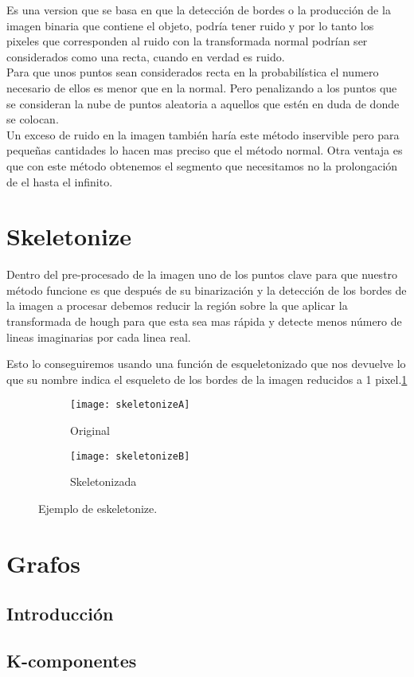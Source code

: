\cite{Kiryati20001157}Es una version que se basa en que la detección de bordes o la producción de la imagen binaria que contiene el objeto, podría tener ruido y por lo tanto los pixeles que corresponden al ruido con la transformada normal podrían ser considerados como una recta, cuando en verdad es ruido.\\
Para que unos puntos sean considerados recta en la probabilística el numero necesario de ellos es menor que en la normal. Pero penalizando a los puntos que se consideran la nube de puntos aleatoria a aquellos que estén en duda de donde se colocan.\\
Un exceso de ruido en la imagen también haría este método inservible pero para pequeñas cantidades lo hacen mas preciso que el método normal.
Otra ventaja es que con este método obtenemos el segmento que necesitamos no la prolongación de el hasta el infinito.

\section{Skeletonize }
\cite{scik:skeleton} Dentro del pre-procesado de la imagen uno de los puntos clave para que nuestro método funcione es que después de su binarización y la detección de los bordes de la imagen a procesar debemos reducir la región sobre la que aplicar la transformada de hough para que esta sea mas rápida y detecte menos número de lineas imaginarias por cada linea real.

Esto lo conseguiremos usando una función de esqueletonizado que nos devuelve lo que su nombre indica el esqueleto de los bordes de la imagen reducidos a 1 pixel.\ref{fig:3.6}


\begin{figure}
\begin{subfigure}[b]{.5\linewidth}
\centering\large \texttt{[image: skeletonizeA]}
\caption{Original}
\end{subfigure}%
\begin{subfigure}[b]{.5\linewidth}
\centering\large \texttt{[image: skeletonizeB]}
\caption{Skeletonizada}
\end{subfigure}
\caption{Ejemplo de eskeletonize.}\label{fig:3.6}
\end{figure}


\section{Grafos}
	
\subsection{Introducción}
\subsection{K-componentes}